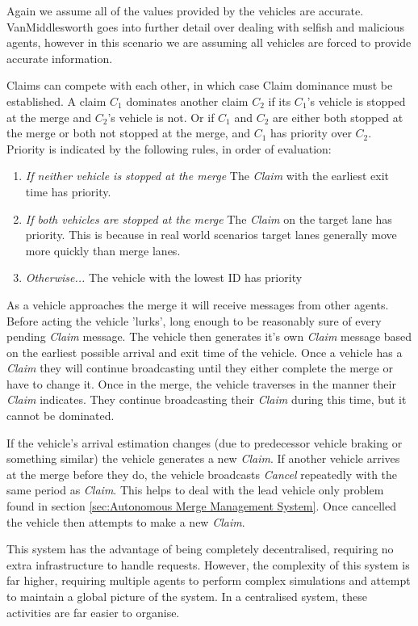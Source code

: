 Again we assume all of the values provided by the vehicles are accurate. VanMiddlesworth \citep{VanMiddlesworth2008} goes into further detail over dealing with selfish and malicious agents, however in this scenario we are assuming all vehicles are forced to provide accurate information.

Claims can compete with each other, in which case Claim dominance must be established. A claim $C_1$ dominates another claim $C_2$ if its $C_1$'s vehicle is stopped at the merge and $C_2$'s vehicle is not. Or if $C_1$ and $C_2$ are either both stopped at the merge or both not stopped at the merge, and $C_1$ has priority over $C_2$. Priority is indicated by the following rules, in order of evaluation:

\begin{enumerate}
\item \emph{If neither vehicle is stopped at the merge} The \emph{Claim} with the earliest exit time has priority.
\item \emph{If both vehicles are stopped at the merge} The \emph{Claim} on the target lane has priority. This is because in real world scenarios target lanes generally move more quickly than merge lanes.
\item \emph{Otherwise...} The vehicle with the lowest ID has priority
\end{enumerate}

As a vehicle approaches the merge it will receive messages from other agents. Before acting the vehicle 'lurks', long enough to be reasonably sure of every pending \emph{Claim} message. The vehicle then generates it's own \emph{Claim} message based on the earliest possible arrival and exit time of the vehicle. Once a vehicle has a \emph{Claim} they will continue broadcasting until they either complete the merge or have to change it. Once in the merge, the vehicle traverses in the manner their \emph{Claim} indicates. They continue broadcasting their \emph{Claim} during this time, but it cannot be dominated. 

If the vehicle's arrival estimation changes (due to predecessor vehicle braking or something similar) the vehicle generates a new \emph{Claim}. If another vehicle arrives at the merge before they do, the vehicle broadcasts \emph{Cancel} repeatedly with the same period as \emph{Claim}. This helps to deal with the lead vehicle only problem found in section \ref{sec:Autonomous Merge Management System}. Once cancelled the vehicle then attempts to make a new \emph{Claim}.

This system has the advantage of being completely decentralised, requiring no extra infrastructure to handle requests. However, the complexity of this system is far higher, requiring multiple agents to perform complex simulations and attempt to maintain a global picture of the system. In a centralised system, these activities are far easier to organise.